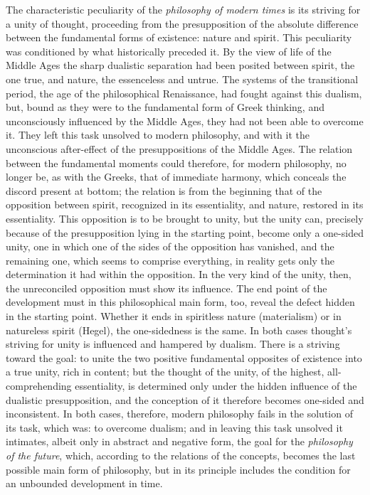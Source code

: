 The characteristic peculiarity of the \emph{philosophy of modern times}
is its striving for a unity of thought, proceeding from the
presupposition of the absolute difference between the fundamental forms
of existence: nature and spirit. This peculiarity was conditioned by
what historically preceded it. By the view of life of the Middle Ages
the sharp dualistic separation had been posited between spirit, the one
true, and nature, the essenceless and untrue. The systems of the
transitional period, the age of the philosophical Renaissance, had
fought against this dualism, but, bound as they were to the fundamental
form of Greek thinking, and unconsciously influenced by the Middle Ages,
they had not been able to overcome it. They left this task unsolved to
modern philosophy, and with it the unconscious after-effect of the
presuppositions of the Middle Ages. The relation between the
fundamental moments could therefore, for modern philosophy, no longer
be, as with the Greeks, that of immediate harmony, which conceals the
discord present at bottom; the relation is from the beginning that of
the opposition between spirit, recognized in its essentiality, and
nature, restored in its essentiality. This opposition is to be brought
to unity, but the unity can, precisely because of the presupposition
lying in the starting point, become only a one-sided unity, one
in which one of the sides of the opposition has vanished, and the
remaining one, which seems to comprise everything, in reality gets only
the determination it had within the opposition. In the very kind of the
unity, then, the unreconciled opposition must show its influence. The
end point of the development must in this philosophical main form, too,
reveal the defect hidden in the starting point. Whether it ends in
spiritless nature (materialism) or in natureless spirit (Hegel), the
one-sidedness is the same. In both cases thought's striving for unity is
influenced and hampered by dualism. There is a striving toward the goal:
to unite the two positive fundamental opposites of existence into a
true unity, rich in content; but the thought of the unity, of the
highest, all-comprehending essentiality, is determined only under the
hidden influence of the dualistic presupposition, and the conception of
it therefore becomes one-sided and inconsistent. In both cases,
therefore, modern philosophy fails in the solution of its task, which
was: to overcome dualism; and in leaving this task unsolved it
intimates, albeit only in abstract and negative form, the goal for the
\emph{philosophy of the future}, which, according to the relations of
the concepts, becomes the last possible main form of philosophy, but in
its principle includes the condition for an unbounded development in
time.

